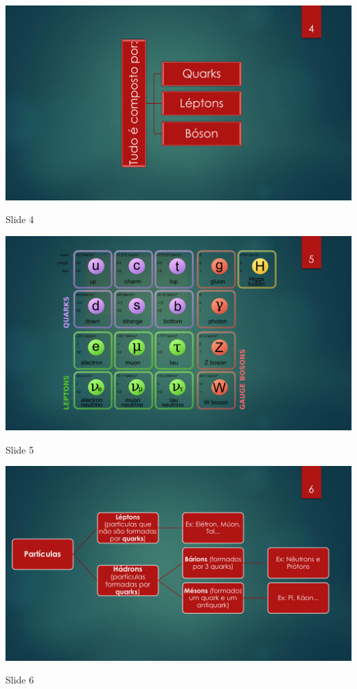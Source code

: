 \begin{figura}[ht]
	\centering
	\includegraphics[width=0.9 \textwidth]{ApeD/slide_4}
	\caption{Slide 4}
	\label{fig:app:slide_4}
\end{figura}

\begin{figura}[ht]
	\centering
	\includegraphics[width=0.9 \textwidth]{ApeD/slide_5}
	\caption{Slide 5}
	\label{fig:app:slide_5}
\end{figura}

\begin{figura}[ht]
	\centering
	\includegraphics[width=0.9 \textwidth]{ApeD/slide_6}
	\caption{Slide 6}
	\label{fig:app:slide_6}
\end{figura}

